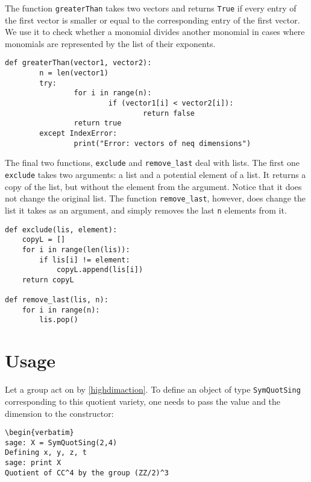 The function \texttt{greaterThan} takes two vectors and returns \texttt{True} if every entry of the first vector is smaller or equal to the corresponding entry of the first vector. We use it to check whether a monomial divides another monomial in cases where monomials are represented by the list of their exponents. 

\vspace{-20pt}
\singlespace
\begin{verbatim}
def greaterThan(vector1, vector2):
        n = len(vector1)
        try:
                for i in range(n):
                        if (vector1[i] < vector2[i]):
                                return false
                return true
        except IndexError:
                print("Error: vectors of neq dimensions")
\end{verbatim}

The final two functions, \texttt{exclude} and \texttt{remove\_last} deal with lists. The first one \texttt{exclude} takes two arguments: a list and a potential element of a list. It returns a copy of the list, but without the element from the argument. Notice that it does not change the original list. The function \texttt{remove\_last}, however, does change the list it takes as an argument, and simply removes the last \texttt{n} elements from it.

\vspace{-20pt}
\singlespace
\begin{verbatim}
def exclude(lis, element):
	copyL = []
	for i in range(len(lis)):
		if lis[i] != element:
			copyL.append(lis[i])
	return copyL

def remove_last(lis, n):
	for i in range(n):
		lis.pop()
\end{verbatim}

\newpage
\section{Usage}

Let a group  act on  by \eqref{highdimaction}. To define an object of type \texttt{SymQuotSing} corresponding to this quotient variety, one needs to pass the value  and the dimension to the constructor:

\vspace{-20pt}
\singlespace
\begin{verbatim}
\begin{verbatim}
sage: X = SymQuotSing(2,4)
Defining x, y, z, t
sage: print X
Quotient of CC^4 by the group (ZZ/2)^3
\end{verbatim}

